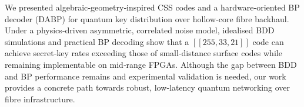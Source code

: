 \documentclass[conference]{IEEEtran}
\begin{document}
We presented algebraic‑geometry‑inspired CSS codes and a hardware‑oriented BP decoder (DABP) for quantum key distribution over hollow‑core fibre backhaul.  Under a physics‑driven asymmetric, correlated noise model, idealised BDD simulations and practical BP decoding show that a $[[255,33,21]]$ code can achieve secret‑key rates exceeding those of small‑distance surface codes while remaining implementable on mid‑range FPGAs.  Although the gap between BDD and BP performance remains and experimental validation is needed, our work provides a concrete path towards robust, low‑latency quantum networking over fibre infrastructure.



\end{document}
